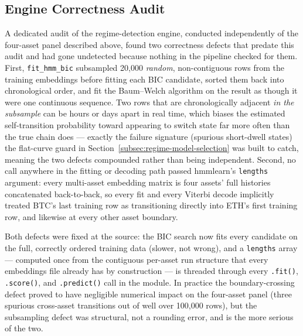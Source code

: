 \subsection{Engine Correctness Audit}
\label{subsec:regime-engine-audit}

A dedicated audit of the regime-detection engine, conducted independently of the four-asset panel described above, found two correctness defects that predate this audit and had gone undetected because nothing in the pipeline checked for them. First, \texttt{fit\_hmm\_bic} subsampled 20{,}000 \emph{random}, non-contiguous rows from the training embeddings before fitting each BIC candidate, sorted them back into chronological order, and fit the Baum--Welch algorithm on the result as though it were one continuous sequence. Two rows that are chronologically adjacent \emph{in the subsample} can be hours or days apart in real time, which biases the estimated self-transition probability toward appearing to switch state far more often than the true chain does --- exactly the failure signature (spurious short-dwell states) the flat-curve guard in Section~\ref{subsec:regime-model-selection} was built to catch, meaning the two defects compounded rather than being independent. Second, no call anywhere in the fitting or decoding path passed hmmlearn's \texttt{lengths} argument: every multi-asset embedding matrix is four assets' full histories concatenated back-to-back, so every fit and every Viterbi decode implicitly treated BTC's last training row as transitioning directly into ETH's first training row, and likewise at every other asset boundary.

Both defects were fixed at the source: the BIC search now fits every candidate on the full, correctly ordered training data (slower, not wrong), and a \texttt{lengths} array --- computed once from the contiguous per-asset run structure that every embeddings file already has by construction --- is threaded through every \texttt{.fit()}, \texttt{.score()}, and \texttt{.predict()} call in the module. In practice the boundary-crossing defect proved to have negligible numerical impact on the four-asset panel (three spurious cross-asset transitions out of well over 100{,}000 rows), but the subsampling defect was structural, not a rounding error, and is the more serious of the two.

